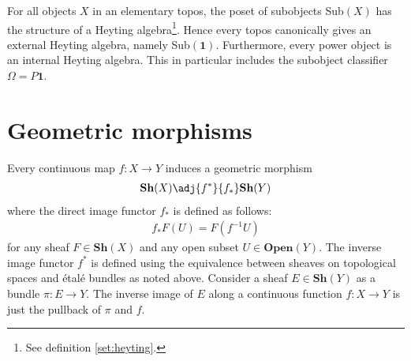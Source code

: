 	
	\begin{property}
		For all objects $X$ in an elementary topos, the poset of subobjects Sub$(X)$ has the structure of a Heyting algebra\footnote{See definition \ref{set:heyting}.}. Hence every topos canonically gives an external Heyting algebra, namely Sub$(\mathbf{1})$. Furthermore, every power object is an internal Heyting algebra. This in particular includes the subobject classifier $\Omega=P{\mathbf{1}}$.
	\end{property}

\section{Geometric morphisms}


	
	\begin{example}
		Every continuous map $f:X\rightarrow Y$ induces a geometric morphism
		\begin{gather}
			\textbf{Sh}(X)\adj{f^*}{f_*}\textbf{Sh}(Y)
		\end{gather}
		where the direct image functor $f_*$ is defined as follows:
		\begin{gather}
			f_*F(U) = F(f^{-1}U)
		\end{gather}
		for any sheaf $F\in\textbf{Sh}(X)$ and any open subset $U\in\textbf{Open}(Y)$. The inverse image functor $f^*$ is defined using the equivalence between sheaves on topological spaces and \'etal\'e bundles as noted above. Consider a sheaf $E\in\mathbf{Sh}(Y)$ as a bundle $\pi:E\rightarrow Y$. The inverse image of $E$ along a continuous function $f:X\rightarrow Y$ is just the pullback of $\pi$ and $f$.
	\end{example}
	
